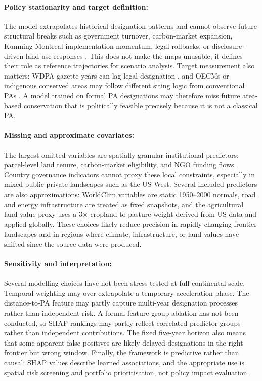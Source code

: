 \documentclass[12pt]{article}
\theoremstyle{break}
\begin{document}
\paragraph{Policy stationarity and target definition:}
The model extrapolates historical designation patterns and cannot observe future
structural breaks such as government turnover, carbon-market expansion,
Kunming-Montreal implementation momentum, legal rollbacks, or disclosure-driven
land-use responses \citep{tnfd2023}. This does not make the maps unusable; it defines
their role as reference trajectories for scenario analysis. Target measurement also
matters: WDPA gazette years can lag legal designation \citep{bingham2019}, and OECMs
or indigenous conserved areas may follow different siting logic from conventional PAs
\citep{maxwell2020}. A model trained on formal PA designations may therefore miss
future area-based conservation that is politically feasible precisely because it is not
a classical PA.

\paragraph{Missing and approximate covariates:}
The largest omitted variables are spatially granular institutional predictors:
parcel-level land tenure, carbon-market eligibility, and NGO funding flows. Country
governance indicators cannot proxy these local constraints, especially in mixed
public-private landscapes such as the US West. Several included predictors are also
approximations: WorldClim variables are static 1950--2000 normals, road and energy
infrastructure are treated as fixed snapshots, and the agricultural land-value proxy
uses a 3$\times$ cropland-to-pasture weight derived from US data and applied globally.
These choices likely reduce precision in rapidly changing frontier landscapes and in
regions where climate, infrastructure, or land values have shifted since the source
data were produced.

\paragraph{Sensitivity and interpretation:}
Several modelling choices have not been stress-tested at full continental scale.
Temporal weighting may over-extrapolate a temporary acceleration phase. The
distance-to-PA feature may partly capture multi-year designation processes rather than
independent risk. A formal feature-group ablation has not been conducted, so SHAP
rankings may partly reflect correlated predictor groups rather than independent
contributions. The fixed five-year horizon also means that some apparent false
positives are likely delayed designations in the right frontier but wrong window.
Finally, the framework is predictive rather than causal: SHAP values describe learned
associations, and the appropriate use is spatial risk screening and portfolio
prioritisation, not policy impact evaluation.
\end{document}
